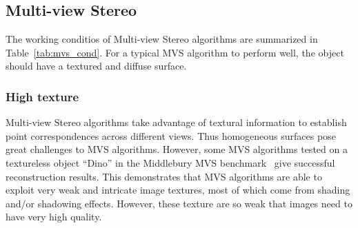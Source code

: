 \subsection{Multi-view Stereo}
The working conditios of Multi-view Stereo algorithms are summarized in Table~\ref{tab:mvs_cond}. For a typical MVS algorithm to perform well, the object should have a textured and diffuse surface.

\subsubsection{High texture}
Multi-view Stereo algorithms take advantage of textural information to establish point correspondences across different views. Thus homogeneous surfaces pose great challenges to MVS algorithms. However, some MVS algorithms tested on a textureless object ``Dino'' in the Middlebury MVS benchmark~\cite{seitz2006comparison} give successful reconstruction results. This demonstrates that MVS algorithms are able to exploit very weak and intricate image textures, most of which come from shading and/or shadowing effects. However, these texture are so weak that images need to have very high quality.


